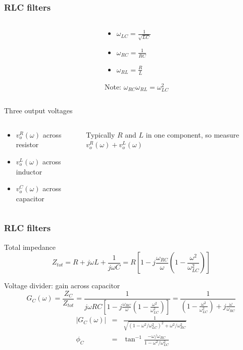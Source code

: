 \documentclass[beamer]{standalone}
\begin{document}
\begin{frame}
 \frametitle{RLC filters}
 \begin{columns}
  \begin{column}{0.4\textwidth}
  \end{column}
  \begin{column}{0.6\textwidth}
   \begin{itemize}
    \item $\omega_{LC} = \frac{1}{\sqrt{LC}}$
    \item $\omega_{RC} = \frac{1}{RC}$
    \item $\omega_{RL} = \frac{R}{L}$
   \end{itemize}
   Note: $\omega_{RC} \omega_{RL} = \omega^2_{LC}$
  \end{column}
 \end{columns}
 \begin{block}{Three output voltages}
  \begin{columns}
   \begin{column}{0.5\textwidth}
    \begin{itemize}
     \item $v_o^R(\omega)$ across resistor
     \item $v_o^L(\omega)$ across inductor
     \item $v_o^C(\omega)$ across capacitor
    \end{itemize}
   \end{column}
   \begin{column}{0.5\textwidth}
    Typically $R$ and $L$ in one component, so measure $v_o^R(\omega) + v_o^L(\omega)$
   \end{column}
  \end{columns}
 \end{block}
\end{frame}

\begin{frame}
 \frametitle{RLC filters}
 \begin{block}{Total impedance}
  \begin{equation*}
   Z_{tot} = R + j\omega L + \frac{1}{j\omega C} = R \left[ 1 - j\frac{\omega_{RC}}{\omega} \left( 1 - \frac{\omega^2}{\omega_{LC}^2} \right) \right]
  \end{equation*}
 \end{block}
 \begin{block}{Voltage divider: gain across capacitor}
  \begin{equation*}
   G_C(\omega) = \frac{Z_C}{Z_{tot}} = \frac{1}{j\omega RC\left[ 1 - j\frac{\omega_{RC}}{\omega} \left( 1 - \frac{\omega^2}{\omega_{LC}^2} \right) \right]} = \frac{1}{\left( 1 - \frac{\omega^2}{\omega_{LC}^2} \right) + j\frac{\omega}{\omega_{RC}}}
  \end{equation*}
  \begin{eqnarray*}
   |G_C(\omega)| & = & \frac{1}{\sqrt{ \left(1 - \omega^2/\omega_{LC}^2 \right)^2 + \omega^2/\omega^2_{RC}}} \\
   \phi_C & = & \tan^{-1} \frac{- \omega/\omega_{RC}}{1 - \omega^2/\omega_{LC}^2}
  \end{eqnarray*}
 \end{block}
\end{frame}
\end{document}
